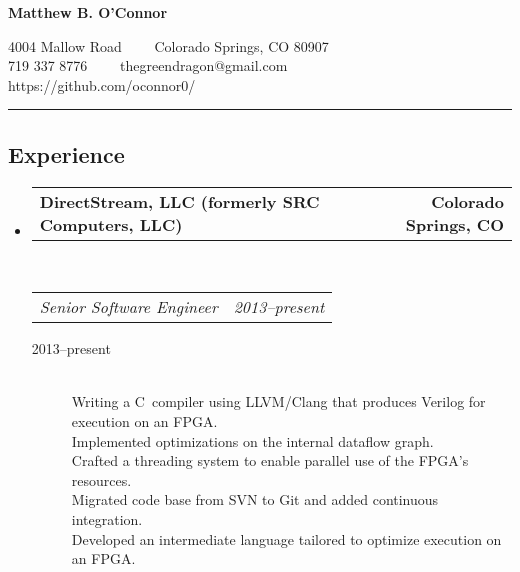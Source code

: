 \documentclass[10pt,letterpaper]{article}
\makeatletter
\newcommand{\headerrow}[2]
{\begin{tabular*}{\linewidth}{l@{\extracolsep{\fill}}r}
  #1 &
  #2 \\
\end{tabular*}}
\newcommand{\CPP}
{C\nolinebreak[4]\hspace{-.05em}\raisebox{.22ex}{\footnotesize\bf ++}}
\makeatother
\begin{document}
\begin{center}
{\LARGE \textbf{Matthew B. O'Connor}}

4004 Mallow Road\ \ \textbullet
\ \ Colorado Springs, CO 80907
\\
719 337 8776\ \ \textbullet
\ \ thegreendragon@gmail.com
\\
https://github.com/oconnor0/
\end{center}

\hrule
\vspace{-0.4em}
\subsection*{Experience}

\begin{itemize}
  \parskip=0.1em

  \item
  \headerrow
    {\textbf{DirectStream, LLC (formerly SRC Computers, LLC)}}
    {\textbf{Colorado Springs, CO}}
  \\
  \headerrow
    {\emph{Senior Software Engineer}}
    {\emph{2013--present}}
  \begin{description}
    \item[2013--present] \hfill \\
        Writing a \CPP \  compiler using LLVM/Clang that produces Verilog for execution on an FPGA. \\
        Implemented optimizations on the internal dataflow graph. \\
        Crafted a threading system to enable parallel use of the FPGA’s resources. \\
        Migrated code base from SVN to Git and added continuous integration. \\
        Developed an intermediate language tailored to optimize execution on an FPGA.
  \end{description}


\end{itemize}
\end{document}
